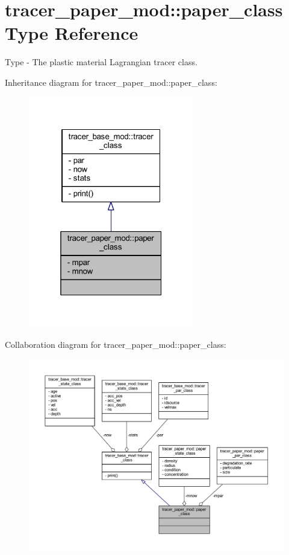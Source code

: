 \hypertarget{structtracer__paper__mod_1_1paper__class}{}\section{tracer\+\_\+paper\+\_\+mod\+:\+:paper\+\_\+class Type Reference}
\label{structtracer__paper__mod_1_1paper__class}


Type -\/ The plastic material Lagrangian tracer class.  




Inheritance diagram for tracer\+\_\+paper\+\_\+mod\+:\+:paper\+\_\+class\+:
\nopagebreak
\begin{figure}[H]
\begin{center}
\leavevmode
\includegraphics[width=205pt]{structtracer__paper__mod_1_1paper__class__inherit__graph}
\end{center}
\end{figure}


Collaboration diagram for tracer\+\_\+paper\+\_\+mod\+:\+:paper\+\_\+class\+:
\nopagebreak
\begin{figure}[H]
\begin{center}
\leavevmode
\includegraphics[width=350pt]{structtracer__paper__mod_1_1paper__class__coll__graph}
\end{center}
\end{figure}
